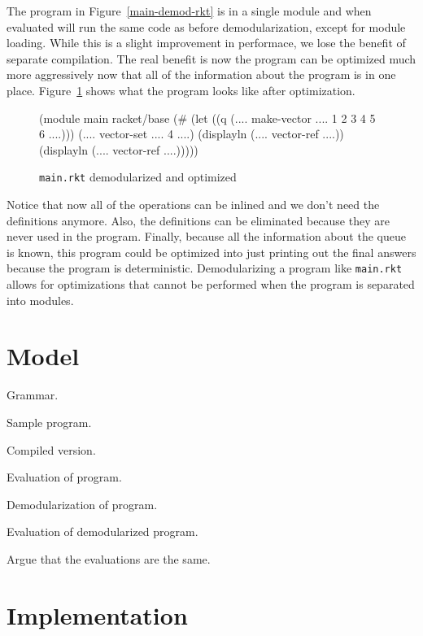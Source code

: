 \documentclass[preprint]{sigplanconf}
\begin{document}
The program in Figure~\ref{main-demod-rkt} is in a single module and when evaluated will run the same code as before demodularization, except for module loading.
While this is a slight improvement in performace, we lose the benefit of separate compilation.
The real benefit is now the program can be optimized much more aggressively now that all of the information about the program is in one place.
Figure~\ref{main-demod-opt-rkt} shows what the program looks like after optimization.

\begin{figure}[h]
\begin{schemedisplay}
(module main racket/base
  (#%
   (let ((q (.... make-vector .... 1 2 3 4 5 6 ....)))
     (.... vector-set .... 4 ....)
     (displayln (.... vector-ref ....))
     (displayln (.... vector-ref ....)))))
\end{schemedisplay}
\caption{\texttt{main.rkt} demodularized and optimized}
\label{main-demod-opt-rkt}
\end{figure}

Notice that now all of the  operations can be inlined and we don't need the definitions anymore.
Also, the  definitions can be eliminated because they are never used in the program.
Finally, because all the information about the queue is known, this program could be optimized into just printing out the final answers because the program is deterministic.
Demodularizing a program like \texttt{main.rkt} allows for optimizations that cannot be performed when the program is separated into modules.


\section{Model}

Grammar.

Sample program.

Compiled version.

Evaluation of program.

Demodularization of program.

Evaluation of demodularized program.

Argue that the evaluations are the same.

\section{Implementation}
\end{document}
